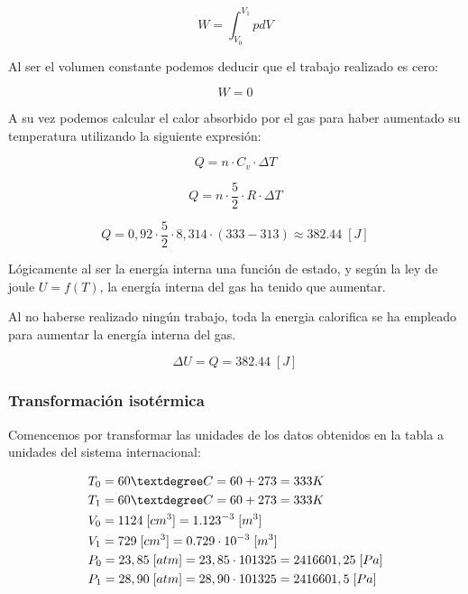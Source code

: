 \documentclass{article}
\begin{document}
\begin{equation}
    W = \int_{V_0}^{V_1} p dV
\end{equation}

Al ser el volumen constante podemos deducir que el trabajo realizado es cero:

\begin{equation}
    W = 0
\end{equation}

A su vez podemos calcular el calor absorbido por el gas para haber aumentado su temperatura utilizando la siguiente expresión:

\begin{equation}
    Q = n \cdot C_v \cdot \Delta T
\end{equation}

\begin{equation}
    Q = n \cdot \frac{5}{2} \cdot R \cdot \Delta T
\end{equation}

\begin{equation}
    Q = 0,92 \cdot \frac{5}{2} \cdot 8,314 \cdot (333 - 313) \approx 382.44 \; [J]
\end{equation}

Lógicamente al ser la energía interna una función de estado, y según la ley de joule \(U = f(T)\), 
la energía interna del gas ha tenido que aumentar.

Al no haberse realizado ningún trabajo, toda la energia calorifica 
se ha empleado para aumentar la energía interna del gas.

\begin{equation}
    \Delta U = Q = 382.44 \; [J]
\end{equation}

\subsubsection{Transformación isotérmica}

Comencemos por transformar las unidades de los datos obtenidos en la tabla a unidades del sistema internacional:

\begin{equation}
    \begin{split}
        & T_0 = 60 \textdegree C = 60 + 273 = 333 K  \\
        & T_1 = 60 \textdegree C = 60 + 273 = 333 K  \\
        & V_0 = 1124 \; [cm^3] = 1.123^{-3} \; [m^3] \\
        & V_1 = 729 \; [cm^3] = 0.729 \cdot 10^{-3} \; [m^3] \\
        & P_0 = 23,85 \; [atm] = 23,85 \cdot 101325 = 2416601,25 \; [Pa] \\
        & P_1 = 28,90 \; [atm] = 28,90 \cdot 101325 = 2416601,5 \; [Pa] \\
    \end{split}
\end{equation}
\end{document}
